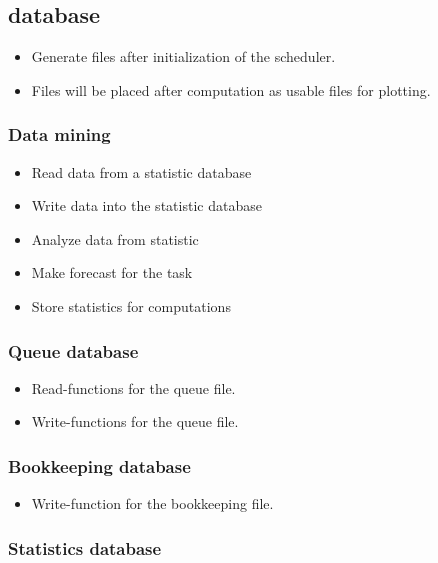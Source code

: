{	\subsection{database}
	
		\begin{itemize}
			\item Generate files after initialization of the scheduler.
			\item Files will be placed after computation as usable files for plotting.
		\end{itemize}
		
		\subsubsection{Data mining}
	
			\begin{itemize}
				\item Read data from a statistic database
				\item Write data into the statistic database
				\item Analyze data from statistic
				\item Make forecast for the task
				\item Store statistics for computations
			\end{itemize}
	
		\subsubsection{Queue database}
	
			\begin{itemize}
				\item Read-functions for the queue file.
				\item Write-functions for the queue file.
			\end{itemize}
		
		\subsubsection{Bookkeeping database}
	
			\begin{itemize}
				\item Write-function for the bookkeeping file.
			\end{itemize}
	
		\subsubsection{Statistics database}
	
}
